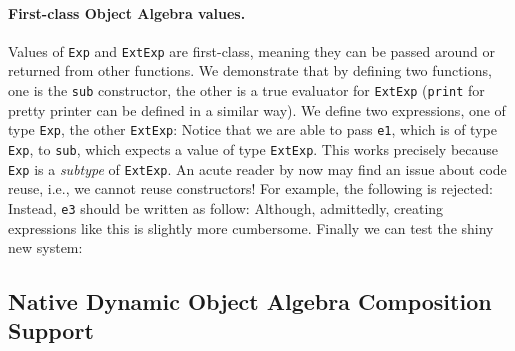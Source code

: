 \paragraph{First-class Object Algebra values.} Values of \lstinline{Exp} and
\lstinline{ExtExp} are first-class, meaning they can be passed around or
returned from other functions. We demonstrate that by defining two functions,
one is the \lstinline{sub} constructor, the other is a true evaluator for
\lstinline{ExtExp} (\lstinline{print} for pretty printer can be defined in a
similar way).
We define two expressions, one of type \lstinline{Exp}, the other
\lstinline{ExtExp}:
Notice that we are able to pass \lstinline{e1}, which is of type
\lstinline{Exp}, to \lstinline{sub}, which expects a value of type
\lstinline{ExtExp}. This works precisely because \lstinline{Exp} is a
\textit{subtype} of \lstinline{ExtExp}. An acute reader by now may find an issue
about code reuse, i.e., we cannot reuse constructors! For example, the following
is rejected:
Instead, \lstinline{e3} should be written as follow:
Although, admittedly, creating expressions like this is slightly more
cumbersome. Finally we can test the shiny new system:


\subsection{Native Dynamic Object Algebra Composition Support}
\label{sec:dynamic}

